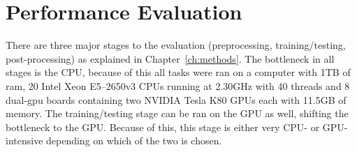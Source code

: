 \chapter{Performance Evaluation}\label{ch:evaluation}

There are three major stages to the evaluation (preprocessing, training/testing, post-processing) as explained in Chapter~\ref{ch:methods}. The bottleneck in all stages is the CPU, because of this all tasks were ran on a computer with 1TB of ram, 20 Intel Xeon E5--2650v3 CPUs running at 2.30GHz with 40 threads and 8 dual-gpu boards containing two NVIDIA Tesla K80 GPUs each with 11.5GB of memory. The training/testing stage can be ran on the GPU as well, shifting the bottleneck to the GPU. Because of this, this stage is either very CPU- or GPU-intensive depending on which of the two is chosen.

